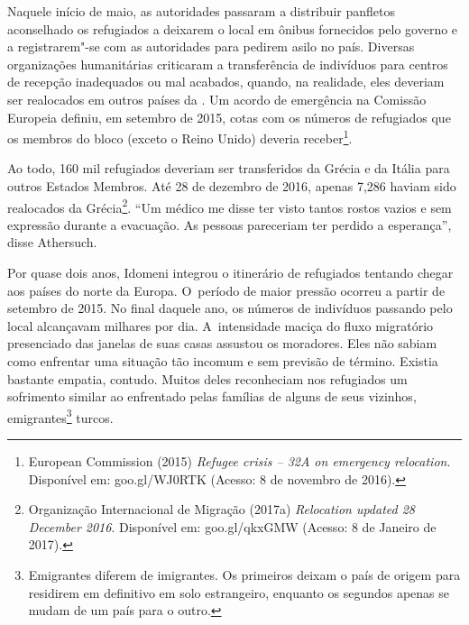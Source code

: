 Naquele início de maio, as autoridades passaram a distribuir panfletos
aconselhado os refugiados a deixarem o local em ônibus fornecidos pelo
governo e a registrarem"-se com as autoridades para pedirem asilo no
país. Diversas organizações humanitárias criticaram a transferência de
indivíduos para centros de recepção inadequados ou mal acabados, quando,
na realidade, eles deveriam ser realocados em outros países da . Um
acordo de emergência na Comissão Europeia definiu, em setembro de 2015,
cotas com os números de refugiados que os membros do bloco (exceto o
Reino Unido) deveria receber\footnote{ European Commission (2015) \emph{Refugee crisis
-- 32A on emergency relocation}. Disponível em:
goo.gl/WJ0RTK
(Acesso: 8
de novembro de 2016).}.

Ao todo, 160 mil refugiados deveriam ser transferidos da Grécia e da
Itália para outros Estados Membros. Até 28 de dezembro de 2016, apenas
7,286 haviam sido realocados da Grécia\footnote{ Organização Internacional de Migração (2017a)
\emph{Relocation updated 28 December 2016}. Disponível em:
goo.gl/qkxGMW
(Acesso: 8 de Janeiro de 2017).}. ``Um médico me
disse ter visto tantos rostos vazios e sem expressão durante a
evacuação. As pessoas pareceriam ter perdido a esperança'', disse
Athersuch.

Por quase dois anos, Idomeni integrou o itinerário de refugiados
tentando chegar aos países do norte da Europa. O~período de maior
pressão ocorreu a partir de setembro de 2015. No final daquele ano, os
números de indivíduos passando pelo local alcançavam milhares por dia. A~intensidade maciça do fluxo migratório presenciado das janelas de suas
casas assustou os moradores. Eles não sabiam como enfrentar uma situação
tão incomum e sem previsão de término. Existia bastante empatia,
contudo. Muitos deles reconheciam nos refugiados um sofrimento similar
ao enfrentado pelas famílias de alguns de seus vizinhos,
emigrantes\footnote{ Emigrantes diferem de imigrantes. Os primeiros
deixam o país de origem para residirem em definitivo em solo
estrangeiro, enquanto os segundos apenas se mudam de um país para o
outro.}  turcos.

